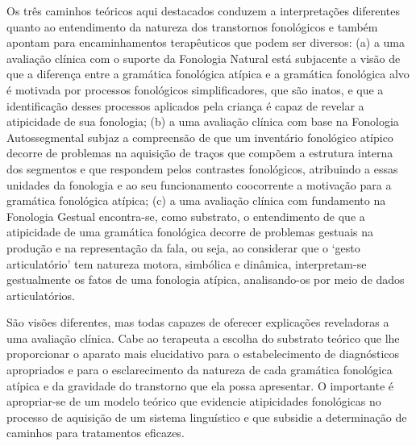 \documentclass[output=paper,colorlinks,citecolor=brown,booklanguage=portuguese]{langscibook}
\begin{document}
Os três caminhos teóricos aqui destacados conduzem a interpretações diferentes quanto ao entendimento da natureza dos transtornos fonológicos e também apontam para encaminhamentos terapêuticos que podem ser diversos: (a) a uma avaliação clínica com o suporte da Fonologia Natural está subjacente a visão de que a diferença entre a gramática fonológica atípica e a gramática fonológica alvo é motivada por processos fonológicos simplificadores, que são inatos, e que a identificação desses processos aplicados pela criança é capaz de revelar a atipicidade de sua fonologia; (b) a uma avaliação clínica com base na Fonologia Autossegmental subjaz a compreensão de que um inventário fonológico atípico decorre de problemas na aquisição de traços que compõem a estrutura interna dos segmentos e que respondem pelos contrastes fonológicos, atribuindo a essas unidades da fonologia e ao seu funcionamento coocorrente a motivação para a  gramática fonológica atípica; (c) a uma avaliação clínica com fundamento na Fonologia Gestual encontra-se, como substrato, o entendimento de que a atipicidade de uma gramática fonológica decorre de problemas gestuais na produção e na representação da fala, ou seja, ao considerar que o  ‘gesto articulatório’ tem natureza motora, simbólica e dinâmica, interpretam-se gestualmente os fatos de uma fonologia atípica, analisando-os por meio de dados articulatórios.

São visões diferentes, mas todas capazes de oferecer explicações reveladoras a uma avaliação clínica. Cabe ao terapeuta a escolha do substrato teórico que lhe proporcionar o aparato mais elucidativo para o estabelecimento de diagnósticos apropriados e para o esclarecimento da natureza de cada gramática fonológica atípica e da gravidade do transtorno que ela possa apresentar. O importante é apropriar-se de um modelo teórico que evidencie atipicidades fonológicas no processo de aquisição de um sistema linguístico e que subsidie a determinação de caminhos para tratamentos eficazes.


{\sloppy\printbibliography[heading=subbibliography,notkeyword=this]}
\clearpage
\end{document}
